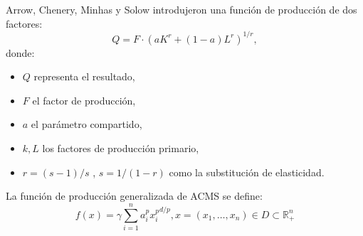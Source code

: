 \documentclass[
    a4paper,%
    11pt, %
    fleqn %
]{article}
\begin{document}
Arrow, Chenery, Minhas y Solow introdujeron una función de producción de dos factores:
\begin{equation}\label{eq:4}
Q = F\cdot(aK^r + (1-a)L^r)^{1/r},
\end{equation}
donde:
\begin{itemize}
    \item $Q$ representa el resultado,
    \item $F$ el factor de producción,
    \item $a$ el parámetro compartido,
    \item $k,L$ los factores de producción primario,
    \item $r=(s- 1)/s$ , $s=1/(1-r)$ como la substitución de elasticidad.
\end{itemize}
La función de producción generalizada de ACMS se define:
\begin{equation}\label{eq:5}
f\left(x\right) = \gamma\sum_{i=1}^{n} {{a}_{i}^{p}{x}_{i}^{p}}^{d/p},x=\left(x_{1},\ldots,x_{n}\right)\in D\subset\mathbb{R}_{+}^{n}
\end{equation}
\end{document}
